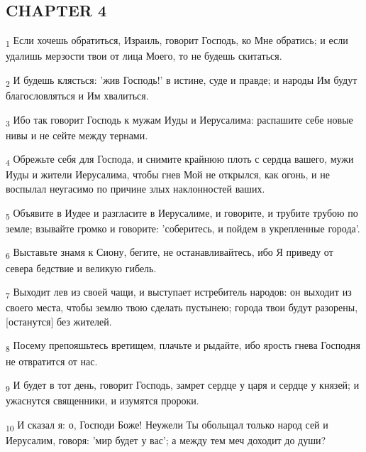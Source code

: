 \subsection{CHAPTER 4}
\begin{tcolorbox}
\textsubscript{1} Если хочешь обратиться, Израиль, говорит Господь, ко Мне обратись; и если удалишь мерзости твои от лица Моего, то не будешь скитаться.
\end{tcolorbox}
\begin{tcolorbox}
\textsubscript{2} И будешь клясться: 'жив Господь!' в истине, суде и правде; и народы Им будут благословляться и Им хвалиться.
\end{tcolorbox}
\begin{tcolorbox}
\textsubscript{3} Ибо так говорит Господь к мужам Иуды и Иерусалима: распашите себе новые нивы и не сейте между тернами.
\end{tcolorbox}
\begin{tcolorbox}
\textsubscript{4} Обрежьте себя для Господа, и снимите крайнюю плоть с сердца вашего, мужи Иуды и жители Иерусалима, чтобы гнев Мой не открылся, как огонь, и не воспылал неугасимо по причине злых наклонностей ваших.
\end{tcolorbox}
\begin{tcolorbox}
\textsubscript{5} Объявите в Иудее и разгласите в Иерусалиме, и говорите, и трубите трубою по земле; взывайте громко и говорите: 'соберитесь, и пойдем в укрепленные города'.
\end{tcolorbox}
\begin{tcolorbox}
\textsubscript{6} Выставьте знамя к Сиону, бегите, не останавливайтесь, ибо Я приведу от севера бедствие и великую гибель.
\end{tcolorbox}
\begin{tcolorbox}
\textsubscript{7} Выходит лев из своей чащи, и выступает истребитель народов: он выходит из своего места, чтобы землю твою сделать пустынею; города твои будут разорены, [останутся] без жителей.
\end{tcolorbox}
\begin{tcolorbox}
\textsubscript{8} Посему препояшьтесь вретищем, плачьте и рыдайте, ибо ярость гнева Господня не отвратится от нас.
\end{tcolorbox}
\begin{tcolorbox}
\textsubscript{9} И будет в тот день, говорит Господь, замрет сердце у царя и сердце у князей; и ужаснутся священники, и изумятся пророки.
\end{tcolorbox}
\begin{tcolorbox}
\textsubscript{10} И сказал я: о, Господи Боже! Неужели Ты обольщал только народ сей и Иерусалим, говоря: 'мир будет у вас'; а между тем меч доходит до души?
\end{tcolorbox}
